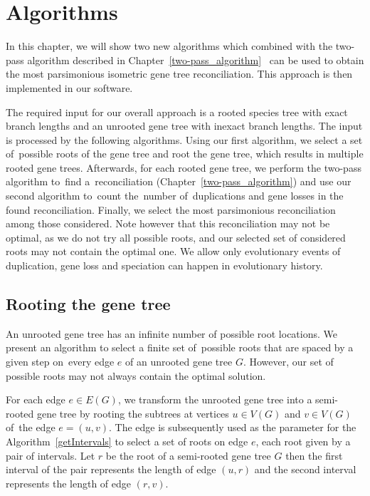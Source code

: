 \chapter{Algorithms} \label{Algorithms}

In this chapter, we will show two new algorithms which combined with the two-pass algorithm described in Chapter~\ref{two-pass_algorithm}~\cite{chladek_thesis} can be used to obtain the most parsimonious isometric gene tree reconciliation. This approach is then implemented in our software.

The required input for our overall approach is a rooted species tree with exact branch lengths and an unrooted gene tree with inexact branch lengths. The input is processed by the following algorithms. Using our first algorithm, we select a set of~possible roots of the gene tree and root the gene tree, which results in multiple rooted gene trees. Afterwards, for each rooted gene tree, we perform the two-pass algorithm to~find a~reconciliation  (Chapter~\ref{two-pass_algorithm}) and use our second algorithm to~count the~number of~duplications and gene losses in the found reconciliation. Finally, we select the most parsimonious reconciliation among those considered. Note however that this  reconciliation may not be optimal, as we do not try all possible roots, and our selected set of considered roots may not contain the optimal one. We allow only evolutionary events of duplication, gene loss and speciation can happen in evolutionary history.

\section{Rooting the gene tree} \label{rooting_the_gene_tree}

An unrooted gene tree has an infinite number of possible root locations. We present an algorithm to select a finite set of~possible roots that are spaced by a given step on~every edge $e$ of an unrooted gene tree $G$. However, our set of possible roots may not always contain the optimal solution. 

For each edge $e \in E(G)$, we transform the unrooted gene tree into a semi-rooted gene tree by rooting the subtrees at vertices $u \in V(G)$ and $v \in V(G)$ of~the edge $e = (u, v)$. The edge is subsequently used as the parameter for the Algorithm~\ref{getIntervals} to select a set of roots on edge $e$, each root given by a pair of intervals. Let $r$ be the root of a semi-rooted gene tree $G$ then the first interval of the pair represents the length of edge $(u, r)$ and the second interval represents the length of edge $(r, v)$.

